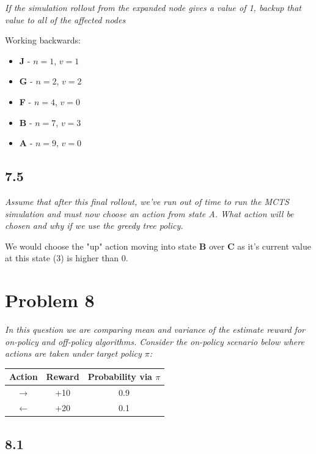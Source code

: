\documentclass{article}
\begin{document}
\textit{If the simulation rollout from the expanded node gives a value of 1, backup that value to all of the affected nodes}

Working backwards:

\begin{itemize}
    \item \textbf{J} - $n=1$, $v=1$
    \item \textbf{G} - $n=2$, $v=2$
    \item \textbf{F} - $n=4$, $v=0$
    \item \textbf{B} - $n=7$, $v=3$
    \item \textbf{A} - $n=9$, $v=0$
\end{itemize}

\subsection*{7.5}

\textit{Assume that after this final rollout, we've run out of time to run the MCTS simulation and must now choose an action from state A. What action will be chosen and why if we use the greedy tree policy.}

We would choose the "up" action moving into state \textbf{B} over \textbf{C} as it's current value at this state (3) is higher than 0.



\section*{Problem 8}
\textit{In this question we are comparing mean and variance of the estimate reward for on-policy and off-policy algorithms. Consider the on-policy scenario below where actions are taken under target policy $\pi$:}

\begin{center}
    \begin{tabular}{ |c|c|c| }
        \hline
        Action        & Reward & Probability via $\pi$ \\
        \hline
        $\rightarrow$ & +10    & 0.9                   \\
        \hline
        $\leftarrow$  & +20    & 0.1                   \\
        \hline
    \end{tabular}
\end{center}

\subsection*{8.1}
\end{document}
